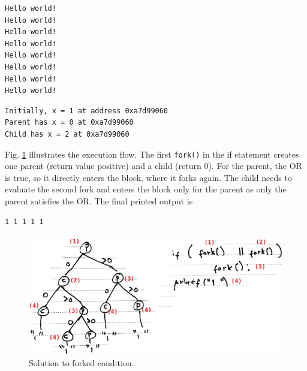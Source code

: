 \documentclass[a4paper]{article}
\begin{document}
\begin{verbatim}
Hello world!
Hello world!
Hello world!
Hello world!
Hello world!
Hello world!
Hello world!
Hello world!
\end{verbatim}


\begin{verbatim}
Initially, x = 1 at address 0xa7d99060
Parent has x = 0 at 0xa7d99060
Child has x = 2 at 0xa7d99060
\end{verbatim}


\begin{exmp}
\textup{

} %
\end{exmp}

Fig. \ref{fig:fork_tree_sol} illustrates the execution flow. The first \texttt{fork()} in the if statement creates one parent (return value positive) and a child (return 0). For the parent, the OR is true, so it directly enters the block, where it forks again. The child needs to evaluate the second fork and enters the block only for the parent as only the parent satisfies the OR. The final printed output is
\begin{verbatim}
1 1 1 1 1
\end{verbatim}
\begin{figure}[H]
    \centering
    \includegraphics[height=5.25cm]{img/fork_tree_sol.png}
    \caption{Solution to forked condition.}
    \label{fig:fork_tree_sol}
\end{figure}
\end{document}
